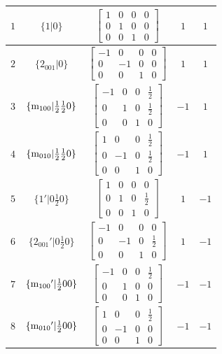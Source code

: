 \documentclass[fleqn,8pt]{jsarticle}
\begin{document}
\begin{longtable}{ccccc}
$ 1 $ & $ \{1|0\} $ & $ \begin{bmatrix} 1 & 0 & 0 & 0 \\ 0 & 1 & 0 & 0 \\ 0 & 0 & 1 & 0 \end{bmatrix} $ & $ 1 $ & $ 1 $ \\ \hline
$ 2 $ & $ \{2{}_{001}|0\} $ & $ \begin{bmatrix} -1 & 0 & 0 & 0 \\ 0 & -1 & 0 & 0 \\ 0 & 0 & 1 & 0 \end{bmatrix} $ & $ 1 $ & $ 1 $ \\ \hline
$ 3 $ & $ \{{\rm m}_{100}|\frac{1}{2} \frac{1}{2} 0\} $ & $ \begin{bmatrix} -1 & 0 & 0 & \frac{1}{2} \\ 0 & 1 & 0 & \frac{1}{2} \\ 0 & 0 & 1 & 0 \end{bmatrix} $ & $ -1 $ & $ 1 $ \\ \hline
$ 4 $ & $ \{{\rm m}_{010}|\frac{1}{2} \frac{1}{2} 0\} $ & $ \begin{bmatrix} 1 & 0 & 0 & \frac{1}{2} \\ 0 & -1 & 0 & \frac{1}{2} \\ 0 & 0 & 1 & 0 \end{bmatrix} $ & $ -1 $ & $ 1 $ \\ \hline
$ 5 $ & $ \{1{}'|0 \frac{1}{2} 0\} $ & $ \begin{bmatrix} 1 & 0 & 0 & 0 \\ 0 & 1 & 0 & \frac{1}{2} \\ 0 & 0 & 1 & 0 \end{bmatrix} $ & $ 1 $ & $ -1 $ \\ \hline
$ 6 $ & $ \{2{}_{001}{}'|0 \frac{1}{2} 0\} $ & $ \begin{bmatrix} -1 & 0 & 0 & 0 \\ 0 & -1 & 0 & \frac{1}{2} \\ 0 & 0 & 1 & 0 \end{bmatrix} $ & $ 1 $ & $ -1 $ \\ \hline
$ 7 $ & $ \{{\rm m}_{100}{}'|\frac{1}{2} 0 0\} $ & $ \begin{bmatrix} -1 & 0 & 0 & \frac{1}{2} \\ 0 & 1 & 0 & 0 \\ 0 & 0 & 1 & 0 \end{bmatrix} $ & $ -1 $ & $ -1 $ \\ \hline
$ 8 $ & $ \{{\rm m}_{010}{}'|\frac{1}{2} 0 0\} $ & $ \begin{bmatrix} 1 & 0 & 0 & \frac{1}{2} \\ 0 & -1 & 0 & 0 \\ 0 & 0 & 1 & 0 \end{bmatrix} $ & $ -1 $ & $ -1 $ \\
\end{longtable}
\end{document}
